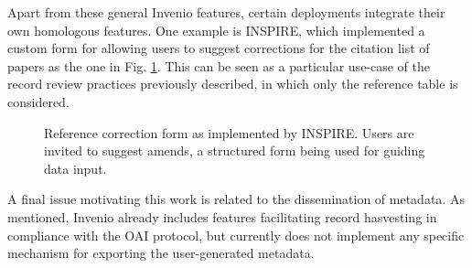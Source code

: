 Apart from these general Invenio features, certain deployments integrate their
own homologous features. One example is INSPIRE, which implemented a custom form
for allowing users to suggest corrections for the citation list of papers as the
one in Fig. \ref{fig:inspire}. This can be seen as a particular use-case of the
record review practices previously described, in which only the reference table
is considered.

\begin{figure}[!ht]
  \centering
  \caption[Reference correction form as implemented by INSPIRE.]
          {Reference correction form as implemented by INSPIRE. Users are
           invited to suggest amends, a structured form being used for guiding
           data input.}
  \label{fig:inspire}
\end{figure}

A final issue motivating this work is related to the dissemination of metadata.
As mentioned, Invenio already includes features facilitating record hasvesting
in compliance with the OAI protocol, but currently does not implement any
specific mechanism for exporting the user-generated metadata.
